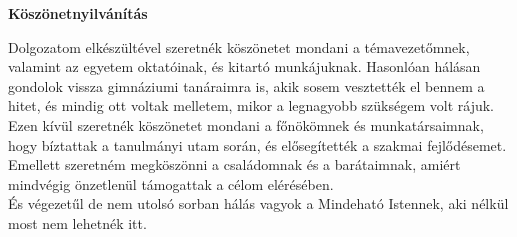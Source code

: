 \textbf{\large{Köszönetnyilvánítás}}\\[32pt]

\thispagestyle{fancy}
\pagestyle{fancy}

Dolgozatom elkészültével szeretnék köszönetet mondani a témavezetőmnek, valamint az egyetem oktatóinak, és kitartó munkájuknak. 
Hasonlóan hálásan gondolok vissza gimnáziumi tanáraimra is, akik sosem vesztették el bennem a hitet, és mindig ott voltak melletem, mikor a legnagyobb szükségem volt rájuk. \\

Ezen kívül szeretnék köszönetet mondani a főnökömnek és munkatársaimnak, hogy bíztattak a tanulmányi utam során, és elősegítették a szakmai fejlődésemet. \\

Emellett szeretném megköszönni a családomnak és a barátaimnak, amiért mindvégig önzetlenül támogattak a célom elérésében.\\

És végezetűl de nem utolsó sorban hálás vagyok a Mindeható Istennek, aki nélkül most nem lehetnék itt. 